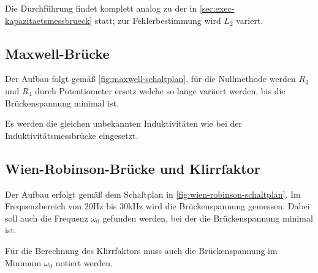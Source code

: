 Die Durchführung findet komplett analog zu der in \autoref{sec:exec-kapazitaetsmessbrueck} statt; zur
Fehlerbestimmung wird $L_2$ variert.

\subsection{Maxwell-Brücke}
\label{sec:exec-maxwell-bruecke}

Der Aufbau folgt gemäß \autoref{fig:maxwell-schaltplan}, für die Nullmethode werden $R_3$ und 
$R_4$ durch Potentiometer ersetz welche so lange variiert werden, bis die Brückenspannung 
minimal ist.

Es werden die gleichen unbekannten Induktivitäten wie bei der Induktivitätsmessbrücke 
eingesetzt.

\subsection{Wien-Robinson-Brücke und Klirrfaktor}
\label{sec:exec-wien-robinson-bruecke}

Der Aufbau erfolgt gemäß dem Schaltplan in \autoref{fig:wien-robinson-schaltplan}. Im 
Frequenzbereich von $20\si{\hertz}$ bis $30\si{\kilo\hertz}$ wird die Brückenspannung gemessen. 
Dabei soll auch die Frequenz $\omega_0$ gefunden werden, bei der die Brückenspannung minimal ist.

Für die Berechnung des Klirrfaktors muss auch die Brückenspannung im Minimum $\omega_0$ notiert werden.
